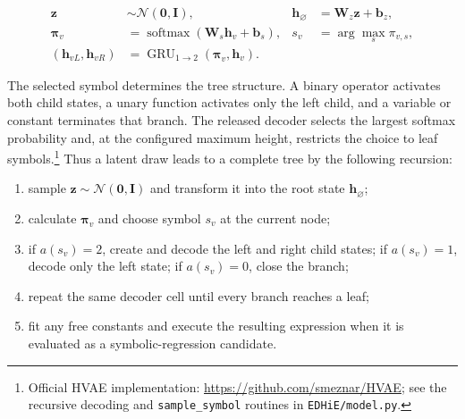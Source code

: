 \begin{equation}
\begin{aligned}
\mathbf z &\sim \mathcal N(\mathbf 0,\mathbf I),
&\mathbf h_{\varnothing}&=\mathbf W_z\mathbf z+\mathbf b_z,\\
\boldsymbol\pi_v
  &=\operatorname{softmax}(\mathbf W_s\mathbf h_v+\mathbf b_s),
&s_v&=\arg\max_s \pi_{v,s},\\
(\mathbf h_{vL},\mathbf h_{vR})
  &=\operatorname{GRU}_{1\rightarrow2}
    (\boldsymbol\pi_v,\mathbf h_v).&&
\end{aligned}
\label{eq:meznar-hvae-decoder}
\end{equation}

The selected symbol determines the tree structure. A binary operator activates
both child states, a unary function activates only the left child, and a
variable or constant terminates that branch. The released decoder selects the
largest softmax probability and, at the configured maximum height, restricts
the choice to leaf symbols.\footnote{Official HVAE implementation:
\url{https://github.com/smeznar/HVAE}; see the recursive decoding and
\texttt{sample\_symbol} routines in \texttt{EDHiE/model.py}.} Thus a latent
draw leads to a complete tree by the following recursion:

\begin{enumerate}
    \item sample $\mathbf z\sim\mathcal N(\mathbf 0,\mathbf I)$ and transform it
    into the root state $\mathbf h_{\varnothing}$;
    \item calculate $\boldsymbol\pi_v$ and choose symbol $s_v$ at the current
    node;
    \item if $a(s_v)=2$, create and decode the left and right child states;
    if $a(s_v)=1$, decode only the left state; if $a(s_v)=0$, close the branch;
    \item repeat the same decoder cell until every branch reaches a leaf;
    \item fit any free constants and execute the resulting expression when it
    is evaluated as a symbolic-regression candidate.
\end{enumerate}

